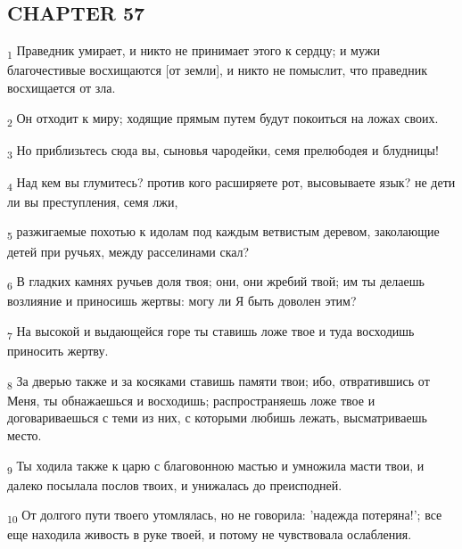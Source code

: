 \subsection{CHAPTER 57}
\begin{tcolorbox}
\textsubscript{1} Праведник умирает, и никто не принимает этого к сердцу; и мужи благочестивые восхищаются [от земли], и никто не помыслит, что праведник восхищается от зла.
\end{tcolorbox}
\begin{tcolorbox}
\textsubscript{2} Он отходит к миру; ходящие прямым путем будут покоиться на ложах своих.
\end{tcolorbox}
\begin{tcolorbox}
\textsubscript{3} Но приблизьтесь сюда вы, сыновья чародейки, семя прелюбодея и блудницы!
\end{tcolorbox}
\begin{tcolorbox}
\textsubscript{4} Над кем вы глумитесь? против кого расширяете рот, высовываете язык? не дети ли вы преступления, семя лжи,
\end{tcolorbox}
\begin{tcolorbox}
\textsubscript{5} разжигаемые похотью к идолам под каждым ветвистым деревом, заколающие детей при ручьях, между расселинами скал?
\end{tcolorbox}
\begin{tcolorbox}
\textsubscript{6} В гладких камнях ручьев доля твоя; они, они жребий твой; им ты делаешь возлияние и приносишь жертвы: могу ли Я быть доволен этим?
\end{tcolorbox}
\begin{tcolorbox}
\textsubscript{7} На высокой и выдающейся горе ты ставишь ложе твое и туда восходишь приносить жертву.
\end{tcolorbox}
\begin{tcolorbox}
\textsubscript{8} За дверью также и за косяками ставишь памяти твои; ибо, отвратившись от Меня, ты обнажаешься и восходишь; распространяешь ложе твое и договариваешься с теми из них, с которыми любишь лежать, высматриваешь место.
\end{tcolorbox}
\begin{tcolorbox}
\textsubscript{9} Ты ходила также к царю с благовонною мастью и умножила масти твои, и далеко посылала послов твоих, и унижалась до преисподней.
\end{tcolorbox}
\begin{tcolorbox}
\textsubscript{10} От долгого пути твоего утомлялась, но не говорила: 'надежда потеряна!'; все еще находила живость в руке твоей, и потому не чувствовала ослабления.
\end{tcolorbox}
